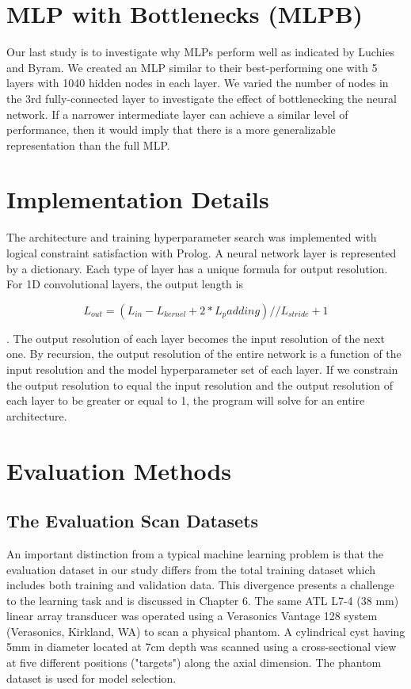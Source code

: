 
  \section{MLP with Bottlenecks (MLPB)}
  Our last study is to investigate why MLPs perform well as indicated by Luchies and Byram. We created an MLP similar to their best-performing one with 5 layers with 1040 hidden nodes in each layer. We varied the number of nodes in the 3rd fully-connected layer to investigate the effect of bottlenecking the neural network. If a narrower intermediate layer can achieve a similar level of performance, then it would imply that there is a more generalizable representation than the full MLP.



\section{Implementation Details}
The architecture and training hyperparameter search was implemented with logical constraint satisfaction with Prolog. A neural network layer is represented by a dictionary. Each type of layer has a unique formula for output resolution. For 1D convolutional layers, the output length is

$$
L_{out} = (L_{in} - L_{kernel} + 2 * L_padding) // L_{stride} + 1
$$

. The output resolution of each layer becomes the input resolution of the next one. By recursion, the output resolution of the entire network is a function of the input resolution and the model hyperparameter set of each layer. If we constrain the output resolution to equal the input resolution and the output resolution of each layer to be greater or equal to 1, the program will solve for an entire architecture.

\section{Evaluation Methods}

\subsection{The Evaluation Scan Datasets}

An important distinction from a typical machine learning problem is that the evaluation dataset in our study differs from the total training dataset which includes both training and validation data. This divergence presents a challenge to the learning task and is discussed in Chapter 6. The same ATL L7-4 (38 mm) linear array transducer was operated using a Verasonics Vantage 128 system (Verasonics, Kirkland, WA) to scan a physical phantom. A cylindrical cyst having 5mm in diameter located at 7cm depth was scanned using a cross-sectional view at five different positions ("targets") along the axial dimension. The phantom dataset is used for model selection.

